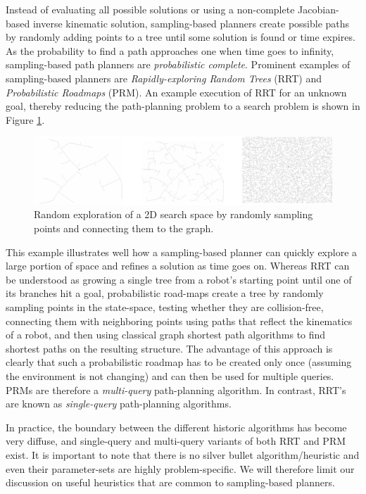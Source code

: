 Instead of evaluating all possible solutions or using a non-complete Jacobian-based inverse kinematic solution, sampling-based planners create possible paths by randomly adding points to a tree until some solution is found or time expires. As the probability to find a path approaches one when time goes to infinity, sampling-based path planners are \emph{probabilistic complete}. Prominent examples of sampling-based planners are \emph{Rapidly-exploring Random Trees} (RRT) and \emph{Probabilistic Roadmaps} (PRM). An example execution of RRT for an unknown goal, thereby reducing the path-planning problem to a search problem is shown in Figure \ref{fig:rrt}.

\begin{figure}
\centering
\includegraphics[width=\textwidth]{figs/rrt}
\caption{Random exploration of a 2D search space by randomly sampling points and connecting them to the graph.\label{fig:rrt}}
\end{figure}

This example illustrates well how a sampling-based planner can quickly explore a large portion of space and refines a solution as time goes on. Whereas RRT can be understood as growing a single tree from a robot's starting point until one of its branches hit a goal, probabilistic road-maps create a tree by randomly sampling points in the state-space, testing whether they are collision-free, connecting them with neighboring points using paths that reflect the kinematics of a robot, and then using classical graph shortest path algorithms to find shortest paths on the resulting structure. The advantage of this approach is clearly that such a probabilistic roadmap has to be created only once (assuming the environment is not changing) and can then be used for multiple queries. PRMs are therefore a \emph{multi-query} path-planning algorithm. In contrast, RRT's are known as \emph{single-query} path-planning algorithms.

In practice, the boundary between the different historic algorithms has become very diffuse, and single-query and multi-query variants of both RRT and PRM exist. It is important to note that there is no silver bullet algorithm/heuristic and even their parameter-sets are highly problem-specific. We will therefore limit our discussion on useful heuristics that are common to sampling-based planners.

